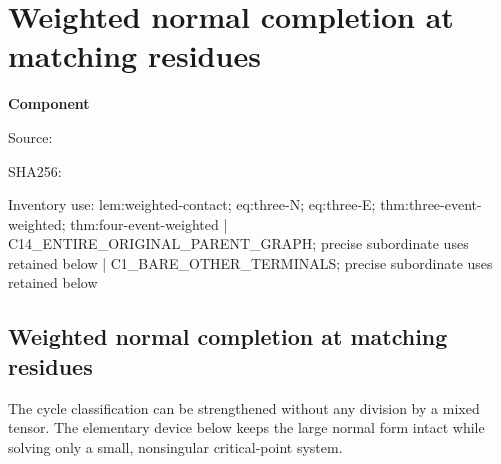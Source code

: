 \chapter{Weighted normal completion at matching residues}
\label{component:p24f8a75e651e}
\noindent\textbf{Component }\par
{\small\noindent Source: \par}
{\small\noindent SHA256: \par}
{\small\noindent Inventory use: lem:weighted-contact; eq:three-N; eq:three-E; thm:three-event-weighted; thm:four-event-weighted | C14\_\allowbreak{}ENTIRE\_\allowbreak{}ORIGINAL\_\allowbreak{}PARENT\_\allowbreak{}GRAPH; precise subordinate uses retained below | C1\_\allowbreak{}BARE\_\allowbreak{}OTHER\_\allowbreak{}TERMINALS; precise subordinate uses retained below\par}
\medskip
\section{Weighted normal completion at matching residues}\label{p24f8a75e651e:sec:zero-d-weighted}
The cycle classification can be strengthened without any division by a mixed tensor. The elementary device below keeps the large normal form intact while solving only a small, nonsingular critical-point system.

